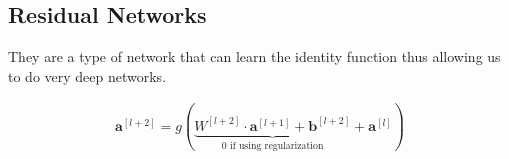 \subsection{Residual Networks}
\begin{frame}{\insertsubsec}
    They are a type of network that can learn the identity function thus allowing us to do
    very deep networks.
    

    \begin{align*}
        \bm{a}^{[l+2]} = 
        g(\underbrace{W^{[l+2]} \cdot \bm{a}^{[l + 1]} + \bm{b}^{[l + 2]}}
        _{0 \text{ if using regularization}} + \bm{a}^{[l]})
    \end{align*}
\end{frame}